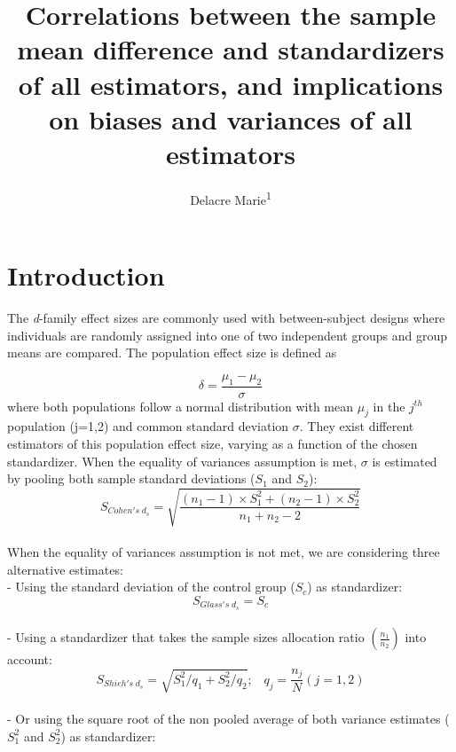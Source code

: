 \documentclass[
  english,
  man]{apa6}
\title{Correlations between the sample mean difference and standardizers of all estimators, and implications on biases and variances of all estimators}
\author{Delacre Marie\textsuperscript{1}}
\date{}
\affiliation{\vspace{0.5cm}\textsuperscript{1} ULB}
\begin{document}
\maketitle

\hypertarget{introduction}{%
\section{Introduction}\label{introduction}}

The \emph{d}-family effect sizes are commonly used with between-subject designs where individuals are randomly assigned into one of two independent groups and group means are compared. The population effect size is defined as

\begin{equation*} 
\delta = \frac{\mu_{1}-\mu_{2}}{\sigma} 
\label{eq:Cohendelta}
\end{equation*}
where both populations follow a normal distribution with mean \(\mu_j\) in the \(j^{th}\) population (j=1,2) and common standard deviation \(\sigma\). They exist different estimators of this population effect size, varying as a function of the chosen standardizer. When the equality of variances assumption is met, \(\sigma\) is estimated by pooling both sample standard deviations (\(S_1\) and \(S_2\)):
\begin{equation*} 
S_{Cohen's \; d_s} = \sqrt{\frac{(n_1-1) \times S_1^2+(n_2-1) \times S_2^2}{n_1+n_2-2}}
\label{eq:Cohends}
\end{equation*}\\
When the equality of variances assumption is not met, we are considering three alternative estimates:\\
- Using the standard deviation of the control group (\(S_c\)) as standardizer:\\
\begin{equation*} 
S_{Glass's \; d_s} = S_{c}
\label{eq:Glassds}
\end{equation*}\\
- Using a standardizer that takes the sample sizes allocation ratio \(\left( \frac{n_1}{n_2}\right)\) into account:\\
\begin{equation*}  
S_{Shieh's \; d_s} = \sqrt{S_1^2/q_1+S_2^2/q_2}; \;\;\; q_j=\frac{n_j}{N} (j=1,2)
\label{eq:Shiehds}
\end{equation*}\\
- Or using the square root of the non pooled average of both variance estimates (\(S^2_1\) and \(S^2_2\)) as standardizer:\\
\end{document}
